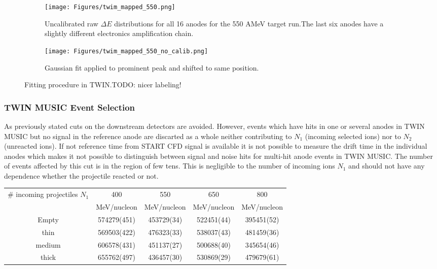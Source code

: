 \begin{figure}
     \centering
     \begin{subfigure}[t]{0.45\textwidth}
         \centering
         \texttt{[image: Figures/twim\_mapped\_550.png]}
         \caption{Uncalibrated raw $\Delta E$ distributions for all 16 anodes for the 550 AMeV target run.The last six anodes have a slightly different electronics amplification chain.}
         \label{fig:raw_twim}
     \end{subfigure}
     \hfill
     \begin{subfigure}[t]{0.45\textwidth}
         \centering
         \texttt{[image: Figures/twim\_mapped\_550\_no\_calib.png]}
         \caption{Gaussian fit applied to prominent peak and shifted to same position.}
         \label{fig:cal_twim_one}
     \end{subfigure}
     \hfill
        \caption{Fitting procedure in TWIN.TODO: nicer labeling!}
        \label{fig:calibration}
\end{figure}
\subsubsection{TWIN MUSIC Event Selection}
As previously stated cuts on the downstream detectors are avoided. However, events which have hits in one or several anodes in TWIN MUSIC but no signal in the reference anode are discarted as a whole neither contributing to $N_1$ (incoming selected ions) nor to $N_2$ (unreacted ions). If not reference time from START CFD signal is available it is not possible to measure the drift time in the individual anodes which makes it not possible to distinguish between signal and noise hits for multi-hit anode events in TWIN MUSIC. The number of events affected by this cut is in the region of few tens. This is negligible to the number of incoming ions $N_1$ and should not have any dependence whether the projectile reacted or not.
\begin{table}[h!]
\centering
\begin{tabular}{|c|c|c|c|c|}
\hline
\makecell{\# incoming \\ projectiles $N_1$}& 400 & 550 & 650 & 800 \\
      & MeV/nucleon & MeV/nucleon & MeV/nucleon & MeV/nucleon \\
\hline
Empty & 574279{\footnotesize(451)} & 453729{\footnotesize(34)} & 522451{\footnotesize(44)} & 395451{\footnotesize(52)} \\
\hline
thin & 569503{\footnotesize(422)} & 476323{\footnotesize(33)} & 538037{\footnotesize(43)} & 481459{\footnotesize(36)} \\
\hline
medium & 606578{\footnotesize(431)} & 451137{\footnotesize(27)} & 500688{\footnotesize(40)} & 345654{\footnotesize(46)} \\
\hline
thick & 655762{\footnotesize(497)} & 436457{\footnotesize(30)} & 530869{\footnotesize(29)} & 479679{\footnotesize(61)} \\
\hline
\end{tabular}
\end{table}
